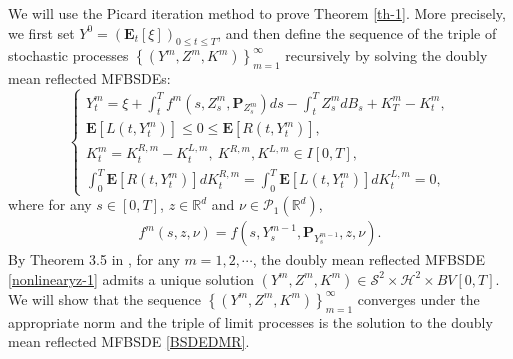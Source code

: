 \documentclass[10pt]{article}%
\numberwithin{equation}{section}
\def \P{\mathbf{P}}
\begin{document}
 We will use the Picard iteration method to  prove Theorem \ref{th-1}. More precisely, we first set $Y^0=\left(\mathbf{E}_{t}\left[\xi\right]\right)_{0\leq t \leq T}$, and then define the sequence of the triple of  stochastic processes $\left\{\left(Y^m,Z^m,K^m\right)\right\}_{m=1}^{\infty}$ recursively  by solving the doubly mean reflected MFBSDEs:
 \begin{equation}\label{nonlinearyz-1}
\begin{cases}
Y^m_t=\xi+\int_t^T f^m(s,Z^m_s,\P_{Z^m_s})ds-\int_t^T Z^m_s dB_s+K^m_T-K^m_t, \\
\mathbf{E}[L(t,Y^m_t)]\leq 0\leq \mathbf{E}[R(t,Y^m_t)], \\
K^m_t=K^{R,m}_t-K^{L,m}_t,\ K^{R,m},K^{L,m}\in I[0,T], \\
\int_0^T \mathbf{E}[R(t,Y^m_t)]dK_t^{R,m}=\int_0^T \mathbf{E}[L(t,Y^m_t)]dK^{L,m}_t=0,
\end{cases}
\end{equation}
where for any $s\in[0,T]$, $z\in\mathbb{R}^d$ and $\nu\in\mathcal{P}_1(\mathbb{R}^d)$,
\begin{align}\label{fm}
    f^m(s,z,\nu)=f(s,Y^{m-1}_s,\P_{Y^{m-1}_s},z,\nu).
\end{align}
By Theorem 3.5 in \cite{LS}, for any $m=1,2,\cdots$, the doubly mean reflected MFBSDE \eqref{nonlinearyz-1} admits a  unique  solution $\left(Y^{m},Z^{m},K^{m}\right)\in \mathcal{S}^2\times\mathcal{H}^2\times BV[0,T]$. We will show that the sequence $\left\{\left(Y^m,Z^m,K^m\right)\right\}_{m=1}^{\infty}$ converges under the appropriate norm and the triple of limit processes is the solution to the doubly mean reflected MFBSDE \eqref{BSDEDMR}.
\end{document}
